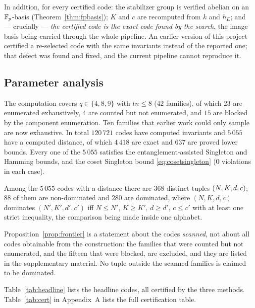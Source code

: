 In addition, for every certified code: the stabilizer group is verified abelian
on an $\mathbb F_p$-basis (Theorem~\ref{thm:fpbasis}); $K$ and $c$ are recomputed from
$k$ and $h_E$; and --- crucially --- \emph{the certified code is the exact code
found by the search}, the image basis being carried through the whole pipeline.
An earlier version of this project certified a re-selected code with the same
invariants instead of the reported one; that defect was found and fixed, and the
current pipeline cannot reproduce it.

\subsection{Parameter analysis}

The computation covers $q\in\{4,8,9\}$ with $tn\le8$ (42 families), of which
$23$ are enumerated exhaustively, $4$ are counted but not enumerated, and $15$
are blocked by the component enumeration. Ten families that earlier work could
only sample are now exhaustive. In total $120\,721$ codes have computed
invariants and $5\,055$ have a computed distance, of which $4\,418$ are exact
and $637$ are proved lower bounds. Every one of the $5\,055$ satisfies the
entanglement-assisted Singleton and Hamming bounds, and the coset Singleton
bound \eqref{eq:cosetsingleton} (0 violations in each case).

\begin{proposition}\label{prop:frontier}
Among the $5\,055$ codes with a distance there are $368$ distinct tuples
$(N,K,d,c)$; $88$ of them are non-dominated and $280$ are dominated, where
$(N,K,d,c)$ dominates $(N',K',d',c')$ iff
$N\le N'$, $K\ge K'$, $d\ge d'$, $c\le c'$ with at least one strict
inequality, the comparison being made inside one alphabet.
\end{proposition}

\begin{remark}
Proposition~\ref{prop:frontier} is a statement about the codes \emph{scanned},
not about all codes obtainable from the construction: the families that were
counted but not enumerated, and the fifteen that were blocked, are excluded, and
they are listed in the supplementary material. No tuple outside the scanned
families is claimed to be dominated.
\end{remark}

Table~\ref{tab:headline} lists the headline codes, all certified by the three
methods. Table~\ref{tab:cert} in Appendix~A lists the full certification table.

